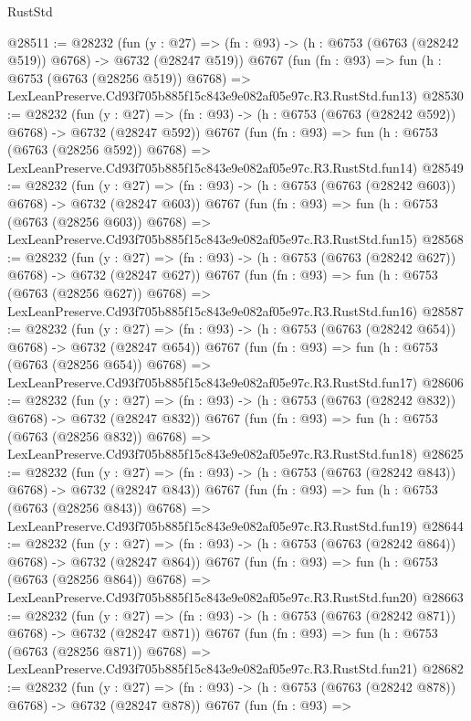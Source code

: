 \begin{lexlean}{RustStd}
\begin{coremodule}
@28511 := @28232
    (fun (y : @27) => (fn : @93) -> (h : @6753 (@6763 (@28242 @519)) @6768) -> @6732 (@28247 @519))
    @6767
    (fun (fn : @93) =>
    fun (h : @6753 (@6763 (@28256 @519)) @6768) =>
    LexLeanPreserve.Cd93f705b885f15c843e9e082af05e97c.R3.RustStd.fun13)
@28530 := @28232
    (fun (y : @27) => (fn : @93) -> (h : @6753 (@6763 (@28242 @592)) @6768) -> @6732 (@28247 @592))
    @6767
    (fun (fn : @93) =>
    fun (h : @6753 (@6763 (@28256 @592)) @6768) =>
    LexLeanPreserve.Cd93f705b885f15c843e9e082af05e97c.R3.RustStd.fun14)
@28549 := @28232
    (fun (y : @27) => (fn : @93) -> (h : @6753 (@6763 (@28242 @603)) @6768) -> @6732 (@28247 @603))
    @6767
    (fun (fn : @93) =>
    fun (h : @6753 (@6763 (@28256 @603)) @6768) =>
    LexLeanPreserve.Cd93f705b885f15c843e9e082af05e97c.R3.RustStd.fun15)
@28568 := @28232
    (fun (y : @27) => (fn : @93) -> (h : @6753 (@6763 (@28242 @627)) @6768) -> @6732 (@28247 @627))
    @6767
    (fun (fn : @93) =>
    fun (h : @6753 (@6763 (@28256 @627)) @6768) =>
    LexLeanPreserve.Cd93f705b885f15c843e9e082af05e97c.R3.RustStd.fun16)
@28587 := @28232
    (fun (y : @27) => (fn : @93) -> (h : @6753 (@6763 (@28242 @654)) @6768) -> @6732 (@28247 @654))
    @6767
    (fun (fn : @93) =>
    fun (h : @6753 (@6763 (@28256 @654)) @6768) =>
    LexLeanPreserve.Cd93f705b885f15c843e9e082af05e97c.R3.RustStd.fun17)
@28606 := @28232
    (fun (y : @27) => (fn : @93) -> (h : @6753 (@6763 (@28242 @832)) @6768) -> @6732 (@28247 @832))
    @6767
    (fun (fn : @93) =>
    fun (h : @6753 (@6763 (@28256 @832)) @6768) =>
    LexLeanPreserve.Cd93f705b885f15c843e9e082af05e97c.R3.RustStd.fun18)
@28625 := @28232
    (fun (y : @27) => (fn : @93) -> (h : @6753 (@6763 (@28242 @843)) @6768) -> @6732 (@28247 @843))
    @6767
    (fun (fn : @93) =>
    fun (h : @6753 (@6763 (@28256 @843)) @6768) =>
    LexLeanPreserve.Cd93f705b885f15c843e9e082af05e97c.R3.RustStd.fun19)
@28644 := @28232
    (fun (y : @27) => (fn : @93) -> (h : @6753 (@6763 (@28242 @864)) @6768) -> @6732 (@28247 @864))
    @6767
    (fun (fn : @93) =>
    fun (h : @6753 (@6763 (@28256 @864)) @6768) =>
    LexLeanPreserve.Cd93f705b885f15c843e9e082af05e97c.R3.RustStd.fun20)
@28663 := @28232
    (fun (y : @27) => (fn : @93) -> (h : @6753 (@6763 (@28242 @871)) @6768) -> @6732 (@28247 @871))
    @6767
    (fun (fn : @93) =>
    fun (h : @6753 (@6763 (@28256 @871)) @6768) =>
    LexLeanPreserve.Cd93f705b885f15c843e9e082af05e97c.R3.RustStd.fun21)
@28682 := @28232
    (fun (y : @27) => (fn : @93) -> (h : @6753 (@6763 (@28242 @878)) @6768) -> @6732 (@28247 @878))
    @6767
    (fun (fn : @93) =>

\end{coremodule}
\end{lexlean}

